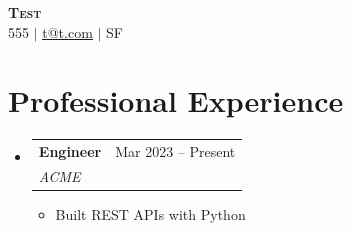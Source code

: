 \documentclass[letterpaper,11pt]{article}
\makeatletter
\newcommand{\resumeItem}[1]{\item\small{{#1 \vspace{-2pt}}}}
\newcommand{\resumeSubheading}[4]{
  \vspace{-2pt}\item
    \begin{tabular*}{0.97\textwidth}[t]{l@{\extracolsep{\fill}}r}
      \textbf{#1} & #2 \\
      \textit{\small#3} & \textit{\small #4} \\
    \end{tabular*}\vspace{-7pt}
}
\newcommand{\resumeSubHeadingListStart}{\begin{itemize}[leftmargin=0.15in, label={}]}
\newcommand{\resumeSubHeadingListEnd}{\end{itemize}}
\newcommand{\resumeItemListStart}{\begin{itemize}}
\newcommand{\resumeItemListEnd}{\end{itemize}\vspace{-5pt}}
\makeatother
\begin{document}
\begin{center}
\textbf{\Huge \scshape Test} \\ \vspace{1pt}
\small 555 $|$ \href{mailto:t@t.com}{\underline{t@t.com}} $|$ SF
\end{center}






\section{Professional Experience}
\resumeSubHeadingListStart


  \resumeSubheading

    {Engineer}{Mar 2023 -- Present}
    {ACME}{}

    \resumeItemListStart


      \resumeItem{Built REST APIs with Python}


    \resumeItemListEnd



\resumeSubHeadingListEnd
\end{document}
